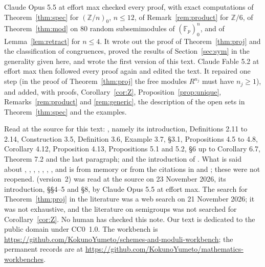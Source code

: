 \documentclass[11pt]{amsart}
\newcommand{\workbenchurl}{https://github.com/KokunoYumeto/schemes-and-moduli-workbench}
\newcommand{\recordurl}{https://github.com/KokunoYumeto/mathematics-workbenches}
\theoremstyle{remark}
\begin{document}
Claude Opus 5.5 at effort max checked every proof, with exact computations of Theorem~\ref{thm:spec} for $(\mathbb Z/n)_0$, $n\le12$, of Remark~\ref{rem:product} for $\mathbb Z/6$, of Theorem~\ref{thm:mod} on 80 random subsemimodules of $(\mathbb F_p)_0^n$, and of Lemma~\ref{lem:retract} for $n\le4$. It wrote out the proof of Theorem~\ref{thm:proj} and the classification of congruences, proved the results of Section~\ref{sec:sym} in the generality given here, and wrote the first version of this text. Claude Fable 5.2 at effort max then followed every proof again and edited the text. It repaired one step (in the proof of Theorem~\ref{thm:proj} the free modules $R^{n_j}$ must have $n_j\ge1$), and added, with proofs, Corollary~\ref{cor:Z}, Proposition~\ref{prop:unique}, Remarks~\ref{rem:product} and \ref{rem:generic}, the description of the open sets in Theorem~\ref{thm:spec} and the examples.

Read at the source for this text: \cite{FGJM}, namely its introduction, Definitions 2.11 to 2.14, Construction 3.5, Definition 3.6, Example 3.7, \S3.1, Propositions 4.5 to 4.8, Corollary 4.12, Proposition 4.13, Propositions 5.1 and 5.2, \S6 up to Corollary 6.7, Theorem 7.2 and the last paragraph; and the introduction of \cite{CCs}. What is said about \cite{Golan}, \cite{Clifford}, \cite{Howie}, \cite{Birkhoff}, \cite{HK}, \cite{BH}, \cite{Rowen}, \cite{CC} and \cite{Pasku} is from memory or from the citations in \cite{FGJM} and \cite{CFMM}; these were not reopened. \cite{CFMM} (version~2) was read at the source on 23 November 2026, its introduction, \S\S4--5 and \S8, by Claude Opus 5.5 at effort max. The search for Theorem~\ref{thm:proj} in the literature was a web search on 21 November 2026; it was not exhaustive, and the literature on semigroups was not searched for Corollary~\ref{cor:Z}. No human has checked this note. Our text is dedicated to the public domain under CC0~1.0. The workbench is \expandafter\url\expandafter{\workbenchurl}; the permanent records are at \expandafter\url\expandafter{\recordurl}.
\end{document}
